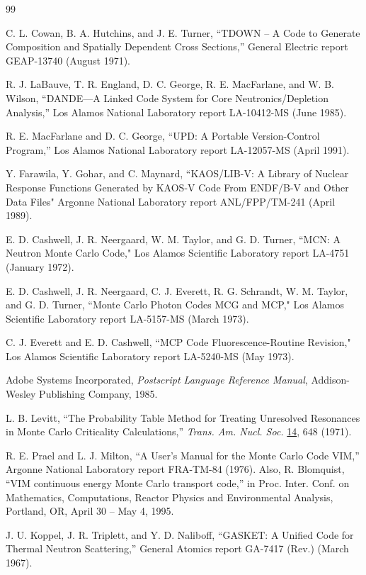 \documentclass[11pt,twoside]{NJOYMan}
\begin{document}
\begin{thebibliography}{99}
\begin{singlespace}
 C. L. Cowan, B. A. Hutchins, and J. E. Turner,
  ``TDOWN -- A Code to Generate Composition and Spatially
  Dependent Cross Sections,'' General Electric report GEAP-13740
  (August 1971).

 R. J. LaBauve, T. R. England, D. C. George,
  R. E. MacFarlane, and W. B. Wilson, ``DANDE---A Linked Code
  System for Core Neutronics/Depletion Analysis,'' Los Alamos
  National Laboratory report LA-10412-MS (June 1985).

 R. E. MacFarlane and D. C. George, ``UPD: A
  Portable Version-Control Program,'' Los Alamos National Laboratory
  report LA-12057-MS (April 1991).

 Y. Farawila, Y. Gohar, and C. Maynard, ``KAOS/LIB-V:
  A Library of Nuclear Response Functions Generated by KAOS-V Code
  From ENDF/B-V and Other Data Files" Argonne National Laboratory
  report ANL/FPP/TM-241 (April 1989).

 E. D. Cashwell, J. R. Neergaard, W. M. Taylor, and
  G. D. Turner, ``MCN: A Neutron Monte Carlo Code," Los Alamos Scientific
  Laboratory report LA-4751 (January 1972).

 E. D. Cashwell, J. R. Neergaard, C. J. Everett,
  R. G. Schrandt, W. M. Taylor, and G. D. Turner, ``Monte Carlo Photon
  Codes MCG and MCP," Los Alamos Scientific Laboratory report
  LA-5157-MS (March 1973).

 C. J. Everett and E. D. Cashwell, ``MCP Code
  Fluorescence-Routine Revision," Los Alamos Scientific Laboratory
  report LA-5240-MS (May 1973).

 Adobe Systems Incorporated, {\it Postscript
  Language Reference Manual}, Addison-Wesley Publishing Company, 1985.

 L. B. Levitt, ``The Probability Table Method
  for Treating Unresolved Resonances in Monte Carlo Criticality
  Calculations,'' {\it Trans. Am. Nucl. Soc.} \underline{14}, 648 (1971).

 R. E. Prael and L. J. Milton, ``A User's Manual
  for the Monte Carlo Code VIM,'' Argonne National Laboratory
  report FRA-TM-84 (1976).  Also, R. Blomquist, ``VIM continuous
  energy Monte Carlo transport code,'' in Proc. Inter. Conf. on
  Mathematics, Computations, Reactor Physics and Environmental
  Analysis, Portland, OR, April 30 -- May 4, 1995.

 J. U. Koppel, J. R. Triplett, and Y. D. Naliboff,
  ``GASKET: A Unified Code for Thermal Neutron Scattering,''
  General Atomics report GA-7417 (Rev.) (March 1967).


\end{singlespace}
\end{thebibliography}
\end{document}
